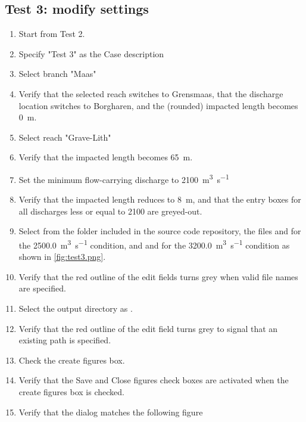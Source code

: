 \subsection{Test 3: modify settings}
\begin{enumerate}
\item Start from Test 2.
\item Specify "Test 3" as the Case description
\item Select branch "Maas"
\item Verify that the selected reach switches to Grensmaas, that the discharge location switches to Borgharen, and the (rounded) impacted length becomes \SI{0}{\metre}.
\item Select reach "Grave-Lith"
\item Verify that the impacted length becomes \SI{65}{\metre}.
\item Set the minimum flow-carrying discharge to \SI{2100}{\metre\cubed\per\second}
\item Verify that the impacted length reduces to \SI{8}{\metre}, and that the entry boxes for all discharges less or equal to 2100 are greyed-out.
\item Select from the folder  included in the \dfmi source code repository, the files  and  for the \SI{2500.0}{\metre\cubed\per\second} condition, and  and  for the \SI{3200.0}{\metre\cubed\per\second} condition as shown in \autoref{fig:test3.png}.
\item Verify that the red outline of the edit fields turns grey when valid file names are specified.
\item Select the output directory as .
\item Verify that the red outline of the edit field turns grey to signal that an existing path is specified.
\item Check the create figures box.
\item Verify that the Save and Close figures check boxes are activated when the create figures box is checked.
\item Verify that the dialog matches the following figure
\begin{figure}[H]
\center

\end{figure}
\end{enumerate}
